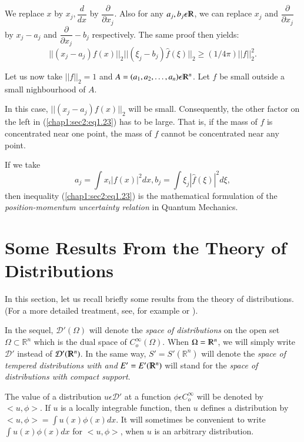 We replace $x$ by $x_j, \dfrac{d}{dx}$ by
$\dfrac{\partial}{\partial x_j}$. Also for any $a_j, b_j \epsilon
\varmathbb{R}$, we can replace $x_j$ and $\dfrac{\partial}{\partial
  x_j}$ by $x_j -a_j$ and $\dfrac{\partial}{\partial x_j} - b_j$
respectively. The same proof then yields:  
\begin{equation*}
  ||(x_j -a_j) f(x) ||_2 || (\xi_j -b_j)
  \hat{f}(\xi) ||_2 \geq (1/4 \pi)
  ||f||^2_2.\tag{1.23}\label{chap1:sec2:eq1.23}  
\end{equation*}\pageoriginale
  
 Let us now take $||f||_2 = 1$ and $A = (a_1, a_2, \ldots, a_n)
 \epsilon \varmathbb{R}^n$. Let $f$ be small outside a small
 nighbourhood of $A$. 
 
In this case, $||(x_j-a_j) f(x) ||_2$ will be small. Consequently, the
other factor on the left in (\ref{chap1:sec2:eq1.23}) has to be
large. That is, if the 
mass of $f$ is concentrated near one point, the mass of $\hat{f}$
cannot be concentrated near any point. 

\setcounter{rem}{23}
\begin{rem}\label{chap1:sec2:rem1.24}%
If we take 
$$
a_j = \int x_i |f(x)|^2 dx,b_j = \int \xi_j |\hat{f}(\xi) |^2 d \xi,
$$
then inequality (\ref{chap1:sec2:eq1.23}) is the mathematical formulation of the
\textit{ position-momentum uncertainty relation } in Quantum
Mechanics. 
 \end{rem} 

\section{Some Results From the Theory of
  Distributions}\label{chap1:sec3} %
 
In this section, let us recall briefly some results from the theory of
distributions. (For a more detailed treatment, see, for example \cite{7}
or \cite{8}). 
 
 In the sequel, $\mathcal{D}' (\Omega) $ will denote the \textit{
   space of distributions } on the open set $\Omega \subset
 \mathbb{R}^n$ which is the dual space of $C^{\infty}_o(\Omega)$. When
 $\Omega = \varmathbb{R}^n$, we will simply write $\mathcal{D}'$
 instead of $\mathcal{D}'(\varmathbb{R}^n)$. In the same way, $S' =
 S'(\mathbb{R}^n)$ will denote the \textit{ space of tempered
   distributions with and } $E' = E' (\varmathbb{R}^n)$ will stand for
 the \textit{space of distributions with compact support}. 
 
The value of a distribution $u \epsilon \mathcal{D}'$ at a function
$\phi \epsilon C^{\infty}_o$ will be denoted by $< u, \phi>$. If
$u$ is a locally integrable function, then $u$ defines a distribution
by $< u, \phi> = \int u(x) \phi (x) dx$. It will sometimes be\pageoriginale
convenient to write $\int u (x) \phi (x) dx$ for $< u, \phi >$, when
$u$ is an arbitrary distribution. 
  
